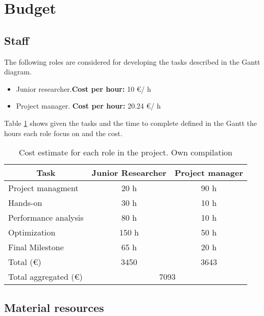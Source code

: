 \section{Budget}

\subsection{Staff}

The following roles are considered for developing the tasks described in the Gantt diagram.

\begin{itemize}
  \item Junior researcher.\textbf{Cost per hour: } 10 \euro / h
  \item Project manager. \textbf{Cost per hour:} 20.24 \euro / h
\end{itemize}

Table \ref{tab:staffcost} shows given the tasks and the time to complete defined in the Gantt the hours each role focus on and the cost.

\begin{table}[htbp!]
\centering
\begin{tabular}{|l|c|c|}
\hline
\multicolumn{1}{|c|}{Task} & Junior Researcher & Project manager \\ \hline
Project managment          & 20 h              & 90 h            \\ \hline
Hands-on                   & 30 h              & 10 h            \\ \hline
Performance analysis       & 80 h              & 10 h            \\ \hline
Optimization               & 150 h             & 50 h            \\ \hline
Final Milestone            & 65 h              & 20 h            \\ \hline
Total (\euro)              & 3450              & 3643            \\ \hline
Total aggregated (\euro)    & \multicolumn{2}{c|}{7093}           \\ \hline
\end{tabular}
\caption[Cost estimate for each role in the project.]{Cost estimate for each role in the project. Own compilation}
\label{tab:staffcost}
\end{table}


\subsection{Material resources}

